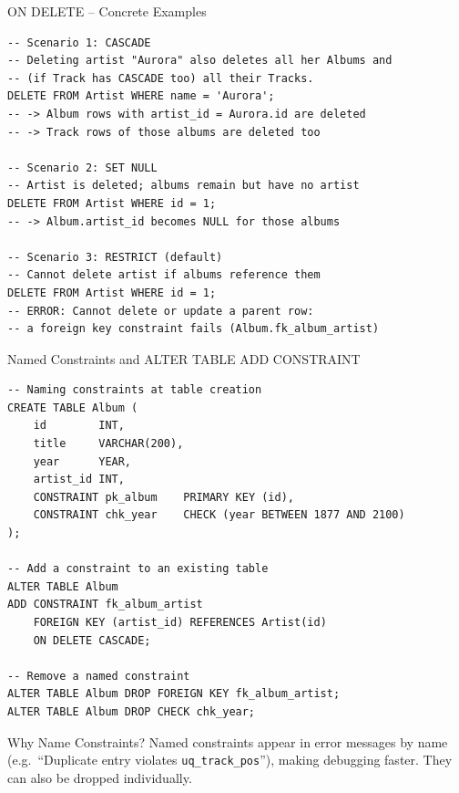 \begin{frame}[fragile]{ON DELETE -- Concrete Examples}
  \begin{lstlisting}[style=sqlstyle]
-- Scenario 1: CASCADE
-- Deleting artist "Aurora" also deletes all her Albums and
-- (if Track has CASCADE too) all their Tracks.
DELETE FROM Artist WHERE name = 'Aurora';
-- -> Album rows with artist_id = Aurora.id are deleted
-- -> Track rows of those albums are deleted too

-- Scenario 2: SET NULL
-- Artist is deleted; albums remain but have no artist
DELETE FROM Artist WHERE id = 1;
-- -> Album.artist_id becomes NULL for those albums

-- Scenario 3: RESTRICT (default)
-- Cannot delete artist if albums reference them
DELETE FROM Artist WHERE id = 1;
-- ERROR: Cannot delete or update a parent row:
-- a foreign key constraint fails (Album.fk_album_artist)
  \end{lstlisting}
\end{frame}

\begin{frame}[fragile]{Named Constraints and ALTER TABLE ADD CONSTRAINT}
  \begin{lstlisting}[style=sqlstyle]
-- Naming constraints at table creation
CREATE TABLE Album (
    id        INT,
    title     VARCHAR(200),
    year      YEAR,
    artist_id INT,
    CONSTRAINT pk_album    PRIMARY KEY (id),
    CONSTRAINT chk_year    CHECK (year BETWEEN 1877 AND 2100)
);

-- Add a constraint to an existing table
ALTER TABLE Album
ADD CONSTRAINT fk_album_artist
    FOREIGN KEY (artist_id) REFERENCES Artist(id)
    ON DELETE CASCADE;

-- Remove a named constraint
ALTER TABLE Album DROP FOREIGN KEY fk_album_artist;
ALTER TABLE Album DROP CHECK chk_year;
  \end{lstlisting}

  \begin{block}{Why Name Constraints?}
    Named constraints appear in error messages by name (e.g.\ ``Duplicate entry violates
    \texttt{uq\_track\_pos}''), making debugging faster. They can also be dropped individually.
  \end{block}
\end{frame}
